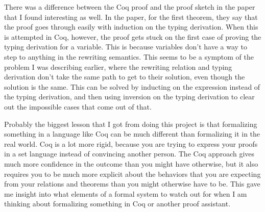 \documentclass[12pt]{article}
\begin{document}
There was a difference between the Coq proof and the proof sketch in the paper
that I found interesting as well. In the paper, for the first theorem, they say
that the proof goes through easily with induction on the typing derivation.
When this is attempted in Coq, however, the proof gets stuck on the first case
of proving the typing derivation for a variable. This is because variables
don't have a way to step to anything in the rewriting semantics. This seems to
be a symptom of the problem I was describing earlier, where the rewriting
relation and typing derivation don't take the same path to get to their
solution, even though the solution is the same. This can be solved by inducting
on the expression instead of the typing derivation, and then using inversion on
the typing derivation to clear out the impossible cases that come out of that.

Probably the biggest lesson that I got from doing this project is that
formalizing something in a language like Coq can be much different than
formalizing it in the real world. Coq is a lot more rigid, because you are
trying to express your proofs in a set language instead of convincing another
person. The Coq approach gives much more confidence in the outcome than you
might have otherwise, but it also requires you to be much more explicit about
the behaviors that you are expecting from your relations and theorems than you
might otherwise have to be. This gave me insight into what elements of a formal
system to watch out for when I am thinking about formalizing something in Coq
or another proof assistant. 
\end{document}
